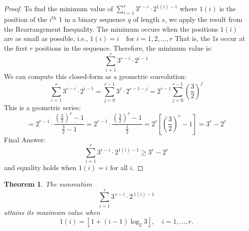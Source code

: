 \documentclass{amsart}
\newtheorem{theorem}{Theorem}[section]
\theoremstyle{definition}
\theoremstyle{remark}
\numberwithin{equation}{section}
\begin{document}
\begin{proof}
	To find the minimum value of
	$	\sum_{i=1}^r 3^{r-i} \cdot 2^{1(i)-1} $
	where $1(i)$ is the position of the $i^\text{th}$ 1 in a binary sequence $q$ of length $s$, we apply the result from the Rearrangement Inequality.	The minimum occurs when the positions $1(i)$ are as small as possible, i.e., $	1(i) = i \quad \text{for } i = 1, 2, \dots, r $
	That is, the 1s occur at the first $r$ positions in the sequence. Therefore, the minimum value is:
	$$	\sum_{i=1}^r 3^{r-i} \cdot 2^{i-1}	$$
    We can compute this closed-form as a geometric convolution:
	$$
	\sum_{i=1}^r 3^{r-i} \cdot 2^{i-1} = \sum_{j=0}^{r-1} 3^{j} \cdot 2^{r-1 - j} = 2^{r-1} \sum_{j=0}^{r-1} \left( \frac{3}{2} \right)^j
	$$
	This is a geometric series:	
	$$
	= 2^{r-1} \cdot \frac{ \left( \frac{3}{2} \right)^r - 1 }{ \frac{3}{2} - 1 } = 2^{r-1} \cdot \frac{ \left( \frac{3}{2} \right)^r - 1 }{ \frac{1}{2} } = 2^r \left[ \left( \frac{3}{2} \right)^r - 1 \right] = 3^{r} - 2^{r}
	$$
	Final Answer:
	$$
	\boxed {\sum_{i=1}^r 3^{r-i} \cdot 2^{1(i)-1} \geq 3^{r} - 2^{r} } 
	$$
	and equality holds when $1(i) = i$ for all $i$.
	
\end{proof}

\begin{theorem}\label{thm:max}
	The summation 
	\[
	\sum_{i=1}^r 3^{\,r-i} \cdot 2^{\,1(i)-1}
	\]
	attains its maximum value when 
	\[
	1(i) = \left\lfloor 1 + (i-1)\log_2 3 \right\rfloor, \quad i=1,\dots,r.
	\]
\end{theorem}
\end{document}
